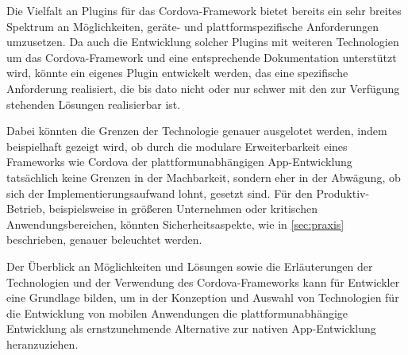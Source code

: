 Die Vielfalt an Plugins für das Cordova-Framework bietet bereits ein sehr breites Spektrum an Möglichkeiten, geräte- und plattformspezifische Anforderungen umzusetzen. Da auch die Entwicklung solcher Plugins mit weiteren Technologien um das Cordova-Framework und eine entsprechende Dokumentation unterstützt wird, könnte ein eigenes Plugin entwickelt werden, das eine spezifische Anforderung realisiert, die bis dato nicht oder nur schwer mit den zur Verfügung stehenden Lösungen realisierbar ist.

Dabei könnten die Grenzen der Technologie genauer ausgelotet werden, indem beispielhaft gezeigt wird, ob durch die modulare Erweiterbarkeit eines Frameworks wie Cordova der plattformunabhängigen App-Entwicklung tatsächlich keine Grenzen in der Machbarkeit, sondern eher in der Abwägung, ob sich der Implementierungsaufwand lohnt, gesetzt sind.
Für den Produktiv-Betrieb, beispielsweise in größeren Unternehmen oder kritischen Anwendungsbereichen, könnten Sicherheitsaspekte, wie in \autoref{sec:praxis} beschrieben, genauer beleuchtet werden. 


Der Überblick an Möglichkeiten und Lösungen sowie die Erläuterungen der Technologien und der Verwendung des Cordova-Frameworks kann für Entwickler eine Grundlage bilden, um in der Konzeption und Auswahl von Technologien für die Entwicklung von mobilen Anwendungen die plattformunabhängige Entwicklung als ernstzunehmende Alternative zur nativen App-Entwicklung heranzuziehen.

